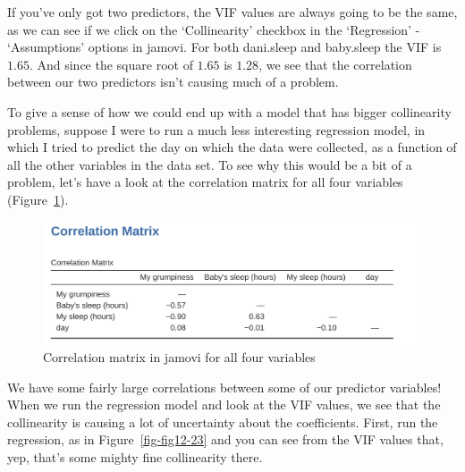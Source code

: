 \documentclass[
  a4paper,
]{book}
\begin{document}
If you've only got two predictors, the VIF values are always going to be
the same, as we can see if we click on the `Collinearity' checkbox in
the `Regression' - `Assumptions' options in jamovi. For both dani.sleep
and baby.sleep the VIF is \(1.65\). And since the square root of
\(1.65\) is \(1.28\), we see that the correlation between our two
predictors isn't causing much of a problem.

To give a sense of how we could end up with a model that has bigger
collinearity problems, suppose I were to run a much less interesting
regression model, in which I tried to predict the day on which the data
were collected, as a function of all the other variables in the data
set. To see why this would be a bit of a problem, let's have a look at
the correlation matrix for all four variables
(Figure~\ref{fig-fig12-22}).

\begin{figure}

\includegraphics[width=1\textwidth,height=\textheight]{images/fig12-22.png} \hfill{}

\caption{\label{fig-fig12-22}Correlation matrix in jamovi for all four
variables}

\end{figure}

We have some fairly large correlations between some of our predictor
variables! When we run the regression model and look at the VIF values,
we see that the collinearity is causing a lot of uncertainty about the
coefficients. First, run the regression, as in Figure~\ref{fig-fig12-23}
and you can see from the VIF values that, yep, that's some mighty fine
collinearity there.
\end{document}
